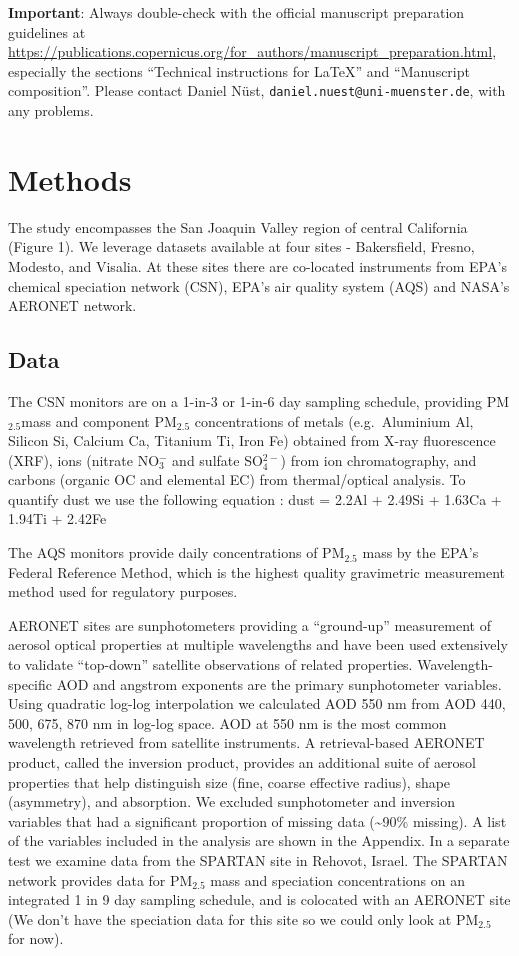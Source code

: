 \documentclass[, manuscript]{copernicus}
\begin{document}
\textbf{Important}: Always double-check with the official manuscript
preparation guidelines at
\url{https://publications.copernicus.org/for_authors/manuscript_preparation.html},
especially the sections ``Technical instructions for LaTeX'' and
``Manuscript composition''. Please contact Daniel Nüst,
\texttt{daniel.nuest@uni-muenster.de}, with any problems.

\section{Methods}

The study encompasses the San Joaquin Valley region of central
California (Figure 1). We leverage datasets available at four sites -
Bakersfield, Fresno, Modesto, and Visalia. At these sites there are
co-located instruments from EPA's chemical speciation network (CSN),
EPA's air quality system (AQS) and NASA's AERONET network.

\subsection{Data}

The CSN monitors are on a 1-in-3 or 1-in-6 day sampling schedule,
providing PM\(_{2.5}\)mass and component PM\(_{2.5}\) concentrations of
metals (e.g.~Aluminium Al, Silicon Si, Calcium Ca, Titanium Ti, Iron Fe)
obtained from X-ray fluorescence (XRF), ions (nitrate NO\(_{3}^-\) and
sulfate SO\(_4^{2-}\)) from ion chromatography, and carbons (organic OC
and elemental EC) from thermal/optical analysis. To quantify dust we use
the following equation \citet{Chow2015}: dust = 2.2Al + 2.49Si + 1.63Ca
+ 1.94Ti + 2.42Fe

The AQS monitors provide daily concentrations of PM\(_{2.5}\) mass by
the EPA's Federal Reference Method, which is the highest quality
gravimetric measurement method used for regulatory purposes.

AERONET sites are sunphotometers providing a ``ground-up'' measurement
of aerosol optical properties at multiple wavelengths and have been used
extensively to validate ``top-down'' satellite observations of related
properties. Wavelength-specific AOD and angstrom exponents are the
primary sunphotometer variables. Using quadratic log-log interpolation
we calculated AOD 550 nm from AOD 440, 500, 675, 870 nm in log-log
space. AOD at 550 nm is the most common wavelength retrieved from
satellite instruments. A retrieval-based AERONET product, called the
inversion product, provides an additional suite of aerosol properties
that help distinguish size (fine, coarse effective radius), shape
(asymmetry), and absorption. We excluded sunphotometer and inversion
variables that had a significant proportion of missing data
(\textasciitilde{}90\% missing). A list of the variables included in the
analysis are shown in the Appendix. In a separate test we examine data
from the SPARTAN site in Rehovot, Israel. The SPARTAN network provides
data for PM\(_{2.5}\) mass and speciation concentrations on an
integrated 1 in 9 day sampling schedule, and is colocated with an
AERONET site (We don't have the speciation data for this site so we
could only look at PM\(_{2.5}\) for now).
\end{document}
